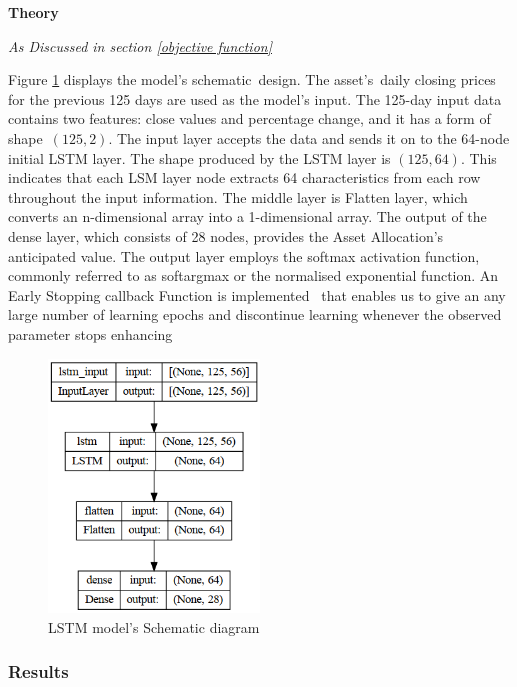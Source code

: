 \textbf{Theory}
\begin{center}
\textit{As Discussed in section \ref{objective function} }
\end{center}
Figure \ref{LSTM_output} displays the model's schematic design. The asset's daily closing prices for the previous 125 days are used as the model's input. The 125-day input data contains two features: close values and percentage change, and it has a form of shape $(125, 2)$. The input layer accepts the data and sends it on to the 64-node initial LSTM layer. The shape produced by the LSTM layer is $(125, 64)$. This indicates that each LSM layer node extracts 64 characteristics from each row throughout the input information. The middle layer is Flatten layer, which converts an n-dimensional array into a 1-dimensional array. The output of the dense layer, which consists of 28 nodes, provides the Asset Allocation's anticipated value. The output layer employs the softmax activation function, commonly referred to as softargmax or the normalised exponential function. An Early Stopping callback Function is implemented  that enables us to give an any large number of learning epochs and discontinue learning whenever the observed parameter stops enhancing
\begin{figure}[H]
\centering
   \includegraphics[width=0.5\textwidth]{LSTM/output.png}
      \caption{LSTM model's Schematic diagram}
       \label{LSTM_output}
\end{figure}
\subsubsection{Results}

